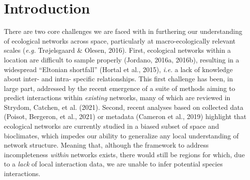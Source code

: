 \documentclass[11pt]{article}
\begin{document}
\clearpage
\linenumbers
\pagestyle{normal}

\hypertarget{introduction}{%
\section{Introduction}\label{introduction}}

There are two core challenges we are faced with in furthering our
understanding of ecological networks across space, particularly at
macro-ecologically relevant scales (\emph{e.g.} Trøjelsgaard \& Olesen,
2016). First, ecological networks within a location are difficult to
sample properly (Jordano, 2016a, 2016b), resulting in a widespread
``Eltonian shortfall'' (Hortal et al., 2015), \emph{i.e.} a lack of
knowledge about inter- and intra- specific relationships. This first
challenge has been, in large part, addressed by the recent emergence of
a suite of methods aiming to predict interactions within \emph{existing}
networks, many of which are reviewed in Strydom, Catchen, et al. (2021).
Second, recent analyses based on collected data (Poisot, Bergeron, et
al., 2021) or metadata (Cameron et al., 2019) highlight that ecological
networks are currently studied in a biased subset of space and
bioclimates, which impedes our ability to generalize any local
understanding of network structure. Meaning that, although the framework
to address incompleteness \emph{within} networks exists, there would
still be regions for which, due to a \emph{lack} of local interaction
data, we are unable to infer potential species interactions.
\end{document}
